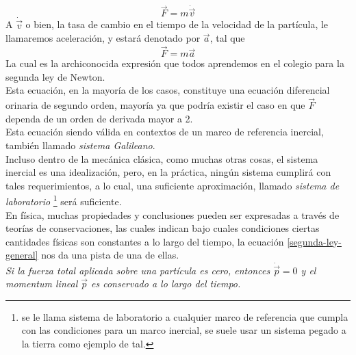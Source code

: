 \documentclass[../main.tex]{subfiles}
\begin{document}
\begin{equation}
    \vec{F}=m\dot{\vec{v}}
\end{equation}
A $ \dot{\vec{v}} $ o bien, la tasa de cambio en el tiempo de la velocidad de la partícula, le llamaremos aceleración, y estará denotado por $\vec{a}$, tal que
\begin{equation} \label{segunda-ley-colegio}
    \vec{F}=m\vec{a}
\end{equation}
La cual es la archiconocida expresión que todos aprendemos en el colegio para la segunda ley de Newton. \\
Esta ecuación, en la mayoría de los casos, constituye una ecuación diferencial orinaria de segundo orden, mayoría ya que podría existir el caso en que $\vec{F}$ dependa de un orden de derivada mayor a 2. \\
Esta ecuación siendo válida en contextos de un marco de referencia inercial, también llamado \emph{sistema Galileano}. \\
Incluso dentro de la mecánica clásica, como muchas otras cosas, el sistema inercial es una idealización, pero, en la práctica, ningún sistema cumplirá con tales requerimientos, a lo cual, una suficiente aproximación, llamado \emph{sistema de laboratorio} \footnote{se le llama sistema de laboratorio a cualquier marco de referencia que cumpla con las condiciones para un marco inercial, se suele usar un sistema pegado a la tierra como ejemplo de tal.} será suficiente. \\
En física, muchas propiedades y conclusiones pueden ser expresadas a través de teorías de conservaciones, las cuales indican bajo cuales condiciones ciertas cantidades físicas son constantes a lo largo del tiempo, la ecuación \eqref{segunda-ley-general} nos da una pista de una de ellas. \\
\emph{Si la fuerza total aplicada sobre una partícula es cero, entonces $\dot{\vec{p}}=0$ y el momentum lineal $\vec{p}$ es conservado a lo largo del tiempo.} \\
\end{document}
